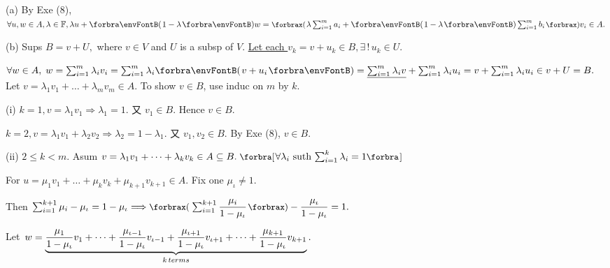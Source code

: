 (a) By Exe (8), $\forall u, w\in A,\lambda\in\Fbb,\lambda u+\Par{1-\lambda}w=\XPar{\lambda\sum_{i=1}^m a_i+\Par{1-\lambda}\sum_{i=1}^m b_i}v_i\in A.$\par\vspace{4pt}\quad
(b) Sups $B=v+U,$ where $v\in V$ and $U$ is a subsp of $V.$ \uline{Let each $v_k=v+u_k\in B,\exists\,!\,u_k\in U.$}\par\vspace{2pt}\quad\Hb
$\forall w\in A,\;w=\sum_{i=1}^m \lambda_i v_i=\sum_{i=1}^m \lambda_i\Par{v+u_i}=\uline{\sum_{i=1}^m \lambda_i v}+\sum_{i=1}^m \lambda_i u_i=v+\sum_{i=1}^m \lambda_i u_i\in v+U=B.$\PfEnd\vspace{6pt}\quad\Hb 
\Or Let $v=\lambda_1 v_1+\dots+\lambda_m v_m\in A$. To show $v\in B$, use induc on $m$ by $k$.\par\quad\Hb
(i) $k=1,v=\lambda_1 v_1\Rightarrow \lambda_1=1.$ 又 $v_1\in B.$ Hence $v\in B$.\par\quad\Hb\Hi
\vspace{4pt}$k=2,v=\lambda_1 v_1+\lambda_2 v_2\Rightarrow\lambda_2=1-\lambda_1.$ 又 $v_1,v_2\in B.$ By Exe (8), $v\in B$.\par\quad\Hb\Endi
(ii) $2\leqslant k<m.$ Asum $v=\lambda_1 v_1+\dots+\lambda_k v_k\in A\subseteq B.\;\Sbra{\forall\lambda_i$ suth $\sum_{i=1}^k\lambda_i=1}$\par\quad\Hb\Hii
\vspace{4pt}For $u=\mu_1 v_1+\dots+\mu_k v_k+\mu_{k+1} v_{k+1}\in A.$ \;Fix one $\mu_\iota\neq 1.$\par\quad\Hb\Hii
\vspace{4pt}Then \;$\sum_{i=1}^{k+1}\mu_i-\mu_\iota=1-\mu_\iota\Longrightarrow\XPar{\sum_{i=1}^{k+1}\Frac{\mu_i}{1-\mu_\iota}}-\Frac{\mu_\iota}{1-\mu_\iota}=1.$\par\quad\Hb\Hii
\vspace{2pt}Let \,$w=\underbrace{{\displaystyle{\frac{\mu_1}{1-\mu_\iota}}}v_1+\dots+{\displaystyle{\frac{\mu_{\iota-1}}{1-\mu_\iota}}}v_{\iota-1}+{\displaystyle{\frac{\mu_{\iota+1}}{1-\mu_\iota}}}v_{\iota+1}+\dots+{\displaystyle{\frac{\mu_{k+1}}{1-\mu_\iota}}}v_{k+1}}_{k\,terms}.$\par\quad\Hb\Hii

